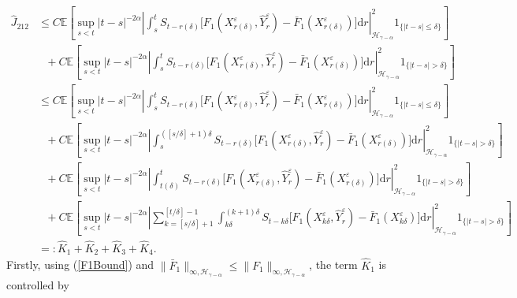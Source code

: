 \documentclass[10pt,a4paper]{article}
\numberwithin{equation}{section}
\begin{document}
\begin{align*}
\hat{J}_{212}&\leq C\mathbb E \left [ \sup_{s<t} |t-s|^{-2\alpha}
	\left| \int_s^t  S_{t-r(\delta)}  \big[F_1(X_{r(\delta)}^\varepsilon,\hat{Y}_r^\varepsilon)-\bar{F}_1(X_{r(\delta)}^\varepsilon) \big]\mathrm{d} r \right|_{\mathcal H_{\gamma-\alpha} }^2 1_{\{|t-s|\leq \delta \}}\right ] \nonumber\\
	&~~~+ C\mathbb E \left [ \sup_{s<t} |t-s|^{-2\alpha}
	\left| \int_s^t  S_{t-r(\delta)}  \big[F_1(X_{r(\delta)}^\varepsilon,\hat{Y}_r^\varepsilon)-\bar{F}_1(X_{r(\delta)}^\varepsilon) \big]\mathrm{d} r \right|_{\mathcal H_{\gamma-\alpha} }^2 1_{ \{|t-s|>\delta \}} \right ] \nonumber\\
	&\leq C \mathbb E \left [ \sup_{s<t} |t-s|^{-2\alpha}
	\left| \int_s^t  S_{t-r(\delta)}  \big[F_1(X_{r(\delta)}^\varepsilon,\hat{Y}_r^\varepsilon)-\bar{F}_1(X_{r(\delta)}^\varepsilon) \big]\mathrm{d} r \right|_{\mathcal H_{\gamma-\alpha} }^2 1_{\{|t-s|\leq \delta \}}\right ] \nonumber\\
	&~~~+ C \mathbb E \left [ \sup_{s<t} |t-s|^{-2\alpha}
	\left| \int_s^{([s/\delta]+1)\delta}  S_{t-r(\delta)}  \big[F_1(X_{r(\delta)}^\varepsilon,\hat{Y}_r^\varepsilon)-\bar{F}_1(X_{r(\delta)}^\varepsilon) \big]\mathrm{d} r \right|_{\mathcal H_{\gamma-\alpha} }^2 1_{ \{|t-s|>\delta \}} \right ] \nonumber\\
	&~~~+ C \mathbb E \left [ \sup_{s<t} |t-s|^{-2\alpha}
	\left| \int_{t(\delta)}^t  S_{t-r(\delta)}  \big[F_1(X_{r(\delta)}^\varepsilon,\hat{Y}_r^\varepsilon)-\bar{F}_1(X_{r(\delta)}^\varepsilon) \big]\mathrm{d} r \right|_{\mathcal H_{\gamma-\alpha} }^2 1_{ \{|t-s|>\delta \}} \right ] \nonumber\\
	&~~~+ C \mathbb E \left[ \sup_{s<t} |t-s|^{-2\alpha}
	\left| \sum_{k=[s/\delta]+1}^{[t/\delta]-1} \int_{k\delta}^{(k+1)\delta} S_{t-k\delta} \big[F_1(X_{k\delta}^\varepsilon,\hat{Y}_r^\varepsilon)-\bar{F}_1(X_{k\delta}^\varepsilon) \big]\mathrm{d} r \right|_{\mathcal H_{\gamma-\alpha} }^2 1_{ \{|t-s|>\delta \}} \right ] \nonumber\\
	&=:\hat{K}_1+\hat{K}_2+\hat{K}_3+\hat{K}_4.
\end{align*}
Firstly, using (\ref{F1Bound}) and $\|\bar{F}_1\|_{\infty,\mathcal H_{\gamma-\alpha}} \leq \|F_1\|_{\infty,\mathcal H_{\gamma-\alpha}}$, the term $\hat{K}_1$ is controlled by
\end{document}
